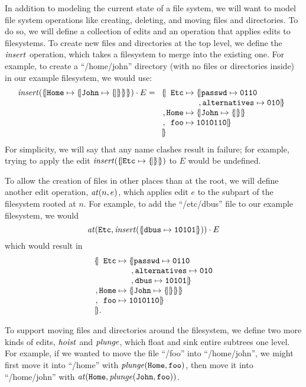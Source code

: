 In addition to modeling the current state of a file system, we will want to
model file system operations like creating, deleting, and moving files and
directories. To do so, we will define a collection of edits and an operation
that applies edits to filesystems. To create new files and directories at
the top level, we define the $\mathit{insert}$ operation, which takes a filesystem
to merge into the existing one. For example, to create a ``/home/john'' directory (with no files
or directories inside) in our example filesystem, we would use:
\[\Insert(\Open\Label{Home}\To\Open\Label{John}\To\Open\Close\Close\Close)\cdot E=
\begin{array}[t]{c@{}r@{\;}l@{\;}l}
    \Open&\Label{Etc} &\To&\Open\Label{passwd}\To\Label{0110} \\
         &            &   &\;,  \Label{alternatives}\To\Label{010}\Close \\
    ,    &\Label{Home}&\To&\Open\Label{John}\To\Open\Close\Close \\
    ,    &\Label{foo} &\To&\Label{1010110}\Close \\
    \Close
\end{array}
\]
For simplicity, we will say that any name clashes result in failure; for
example, trying to apply the edit $\mathit{insert}(\{\hspace{-2pt}|\mathtt{Etc}\mapsto\{\hspace{-2pt}||\hspace{-2pt}\}|\hspace{-2pt}\})$ to $E$
would be undefined.

To allow the creation of files in other places than at the root, we will
define another edit operation, $\mathit{at}(n,e)$, which applies edit $e$ to the
subpart of the filesystem rooted at $n$. For example, to add the
``/etc/dbus'' file to our example filesystem, we would
\[\mathit{at}(\mathtt{Etc},\mathit{insert}(\{\hspace{-2pt}|\mathtt{dbus}\mapsto\mathtt{10101}|\hspace{-2pt}\}))\cdot
E\]
which would result in
\[
\begin{array}{c@{}r@{\;}l@{\;}l}
    \Open&\Label{Etc} &\To&\Open\Label{passwd}\To\Label{0110} \\
         &            &   &\;,  \Label{alternatives}\To\Label{010} \\
         &            &   &\;,  \Label{dbus}\To\Label{10101}\Close \\
    ,    &\Label{Home}&\To&\Open\Label{John}\To\Open\Close\Close\Close \\
    ,    &\Label{foo} &\To&\Label{1010110}\Close \\
    \Close.\!\!
\end{array}
\]

To support moving files and directories around the filesystem, we
define two more kinds of edits, $\mathit{hoist}$ and $\mathit{plunge}$, which float and sink
entire subtrees one level. For example, if we wanted to move the file
``/foo'' into ``/home/john'', we might first move it into ``/home'' with
$\mathit{plunge}(\mathtt{Home},\mathtt{foo})$, then move it into ``/home/john'' with
$\mathit{at}(\mathtt{Home},\mathit{plunge}(\mathtt{John},\mathtt{foo}))$.


